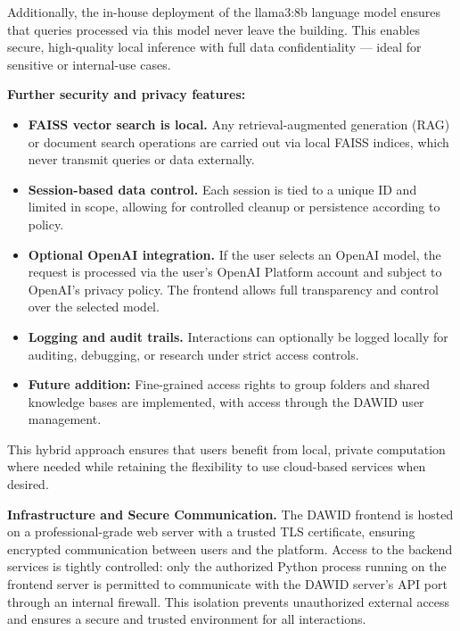 Additionally, the in-house deployment of the llama3:8b language model ensures that queries processed via this model never leave the building. This enables secure, high-quality local inference with full data confidentiality — ideal for sensitive or internal-use cases.

\vspace{0.5em}
\textbf{Further security and privacy features:}
\begin{itemize}
\item \textbf{FAISS vector search is local.} Any retrieval-augmented generation (RAG) or document search operations are carried out via local FAISS indices, which never transmit queries or data externally.
\item \textbf{Session-based data control.} Each session is tied to a unique ID and limited in scope, allowing for controlled cleanup or persistence according to policy.
\item \textbf{Optional OpenAI integration.} If the user selects an OpenAI model, the request is processed via the user’s OpenAI Platform account and subject to OpenAI’s privacy policy. The frontend allows full transparency and control over the selected model.
\item \textbf{Logging and audit trails.} Interactions can optionally be logged locally for auditing, debugging, or research under strict access controls.
\item \textbf{Future addition:} Fine-grained access rights to group folders and shared knowledge bases are implemented, with access through the DAWID user management.
\end{itemize}

This hybrid approach ensures that users benefit from local, private computation where needed while retaining the flexibility to use cloud-based services when desired.

\textbf{Infrastructure and Secure Communication.} The DAWID frontend is hosted on a professional-grade web server with a trusted TLS certificate, ensuring encrypted communication between users and the platform. Access to the backend services is tightly controlled: only the authorized Python process running on the frontend server is permitted to communicate with the DAWID server’s API port through an internal firewall. This isolation prevents unauthorized external access and ensures a secure and trusted environment for all interactions.


%
